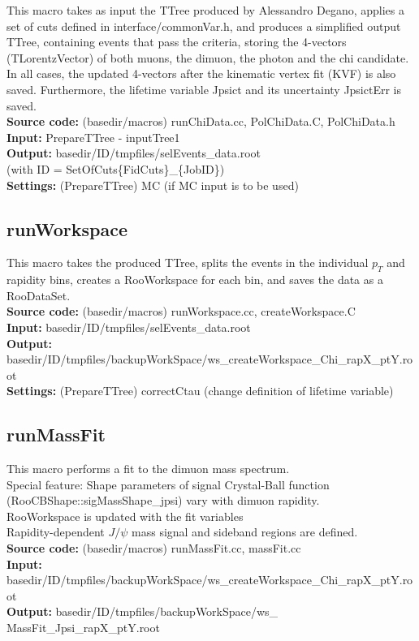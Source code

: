 \documentclass{article}
\begin{document}
This macro takes as input the TTree produced by Alessandro Degano, applies a set of cuts defined in interface/commonVar.h, and produces a simplified output TTree, containing events that pass the criteria, storing the 4-vectors (TLorentz\-Vector) of both muons, the dimuon, the photon and the chi candidate. In all cases, the updated 4-vectors after the kinematic vertex fit (KVF) is also saved. Furthermore, the lifetime variable Jpsict and its uncertainty JpsictErr is saved.
\\{\bf Source code:} (basedir/macros) runChiData.cc, PolChiData.C, PolChiData.h
\\{\bf Input:} PrepareTTree - inputTree1
\\{\bf Output:} basedir/ID/tmpfiles/selEvents\_data.root
\\(with ID = SetOfCuts\{FidCuts\}\_\{JobID\})
\\{\bf Settings:} (PrepareTTree) MC (if MC input is to be used)

\subsection{runWorkspace}

This macro takes the produced TTree, splits the events in the individual $p_T$ and rapidity bins, creates a RooWorkspace for each bin, and saves the data as a RooDataSet.
\\{\bf Source code:} (basedir/macros) runWorkspace.cc, createWorkspace.C
\\{\bf Input:} basedir/ID/tmpfiles/selEvents\_data.root
\\{\bf Output:} basedir/ID/tmpfiles/backupWorkSpace/ws\_createWorkspace\_Chi\_rapX\_ptY.root
\\{\bf Settings:} (PrepareTTree) correctCtau (change definition of lifetime variable)

\subsection{runMassFit}

This macro performs a fit to the dimuon mass spectrum.
\\Special feature: Shape parameters of signal Crystal-Ball function (RooCBShape::sigMassShape\_jpsi) vary with dimuon rapidity.
\\RooWorkspace is updated with the fit variables
\\Rapidity-dependent $J/\psi$ mass signal and sideband regions are defined.
\\{\bf Source code:} (basedir/macros) runMassFit.cc, massFit.cc
\\{\bf Input:} basedir/ID/tmpfiles/backupWorkSpace/ws\_createWorkspace\_Chi\_rapX\_ptY.root
\\{\bf Output:} basedir/ID/tmpfiles/backupWorkSpace/ws\_ MassFit\_Jpsi\_rapX\_ptY.root
\end{document}
